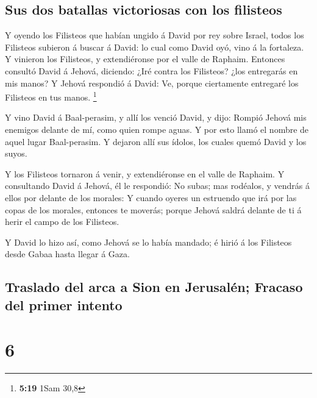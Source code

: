 \hypertarget{sus-dos-batallas-victoriosas-con-los-filisteos}{%
\subsection{Sus dos batallas victoriosas con los
filisteos}\label{sus-dos-batallas-victoriosas-con-los-filisteos}}

 Y oyendo los Filisteos que habían ungido á David por rey
sobre Israel, todos los Filisteos subieron á buscar á David: lo cual
como David oyó, vino á la fortaleza.  Y vinieron los
Filisteos, y extendiéronse por el valle de Raphaim. 
Entonces consultó David á Jehová, diciendo: ¿Iré contra los Filisteos?
¿los entregarás en mis manos? Y Jehová respondió á David: Ve, porque
ciertamente entregaré los Filisteos en tus manos. \footnote{\textbf{5:19}
  1Sam 30,8}

 Y vino David á Baal-perasim, y allí los venció David, y
dijo: Rompió Jehová mis enemigos delante de mí, como quien rompe aguas.
Y por esto llamó el nombre de aquel lugar Baal-perasim.  Y
dejaron allí sus ídolos, los cuales quemó David y los suyos.

 Y los Filisteos tornaron á venir, y extendiéronse en el
valle de Raphaim.  Y consultando David á Jehová, él le
respondió: No subas; mas rodéalos, y vendrás á ellos por delante de los
morales:  Y cuando oyeres un estruendo que irá por las
copas de los morales, entonces te moverás; porque Jehová saldrá delante
de ti á herir el campo de los Filisteos.

 Y David lo hizo así, como Jehová se lo había mandado; é
hirió á los Filisteos desde Gabaa hasta llegar á Gaza.

\hypertarget{traslado-del-arca-a-sion-en-jerusaluxe9n-fracaso-del-primer-intento}{%
\subsection{Traslado del arca a Sion en Jerusalén; Fracaso del primer
intento}\label{traslado-del-arca-a-sion-en-jerusaluxe9n-fracaso-del-primer-intento}}

\hypertarget{section-5}{%
\section{6}\label{section-5}}


